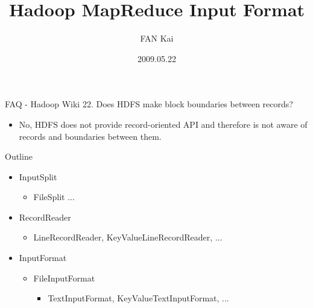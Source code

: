 \documentclass{beamer}
\begin{document}
\title{Hadoop MapReduce Input Format}
\author[FAN Kai, PKU CNDS, fankai@net.pku.edu.cn]{FAN Kai}
\date{2009.05.22}

\begin{frame}[label=titlepage]
    \titlepage
\end{frame}

\begin{frame}{FAQ - Hadoop Wiki}
    \alert{22. Does HDFS make block boundaries between records?} 
    \begin{itemize}
    \item No, HDFS does not provide record-oriented API and therefore is not aware of records and boundaries between them. 
    \end{itemize}
\end{frame}

\begin{frame}{Outline}
    \begin{itemize}
    \item InputSplit
        \begin{itemize}
        \item FileSplit ...
        \end{itemize}
    \item RecordReader
        \begin{itemize}
        \item LineRecordReader, KeyValueLineRecordReader, ...
        \end{itemize}
    \item InputFormat
        \begin{itemize}
        \item FileInputFormat
            \begin{itemize}
            \item TextInputFormat, KeyValueTextInputFormat, ...
            \end{itemize}
        \end{itemize}
    \end{itemize}
\end{frame}
\end{document}
